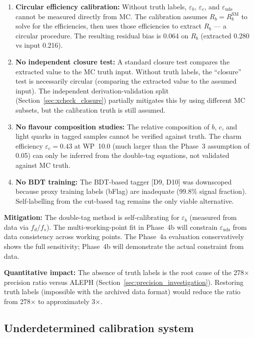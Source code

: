 \documentclass[11pt,a4paper]{article}
\begin{document}
\begin{enumerate}
\item \textbf{Circular efficiency calibration:} Without truth labels, $\varepsilon_b$,
$\varepsilon_c$, and $\varepsilon_\mathrm{uds}$ cannot be measured directly from MC.
The calibration assumes $R_b = R_b^\mathrm{SM}$ to solve for the efficiencies, then
uses those efficiencies to extract $R_b$ --- a circular procedure. The resulting
residual bias is 0.064 on $R_b$ (extracted 0.280 vs input 0.216).

\item \textbf{No independent closure test:} A standard closure test compares the
extracted value to the MC truth input. Without truth labels, the ``closure'' test
is necessarily circular (comparing the extracted value to the assumed input). The
independent derivation-validation split (Section~\ref{sec:xcheck_closure}) partially
mitigates this by using different MC subsets, but the calibration truth is still
assumed.

\item \textbf{No flavour composition studies:} The relative composition of $b$, $c$,
and light quarks in tagged samples cannot be verified against truth. The charm
efficiency $\varepsilon_c = 0.43$ at WP~10.0 (much larger than the Phase~3 assumption
of 0.05) can only be inferred from the double-tag equations, not validated against
MC truth.

\item \textbf{No BDT training:} The BDT-based tagger [D9, D10] was downscoped
because proxy training labels (bFlag) are inadequate (99.8\% signal fraction).
Self-labelling from the cut-based tag remains the only viable alternative.
\end{enumerate}

\textbf{Mitigation:} The double-tag method is self-calibrating for $\varepsilon_b$
(measured from data via $f_d / f_s$). The multi-working-point fit in Phase~4b will
constrain $\varepsilon_\mathrm{uds}$ from data consistency across working points.
The Phase~4a evaluation conservatively shows the full sensitivity; Phase~4b will
demonstrate the actual constraint from data.

\textbf{Quantitative impact:} The absence of truth labels is the root cause of
the 278$\times$ precision ratio versus ALEPH (Section~\ref{sec:precision_investigation}).
Restoring truth labels (impossible with the archived data format) would reduce the
ratio from 278$\times$ to approximately 3$\times$.

\subsection{Underdetermined calibration system}
\end{document}
